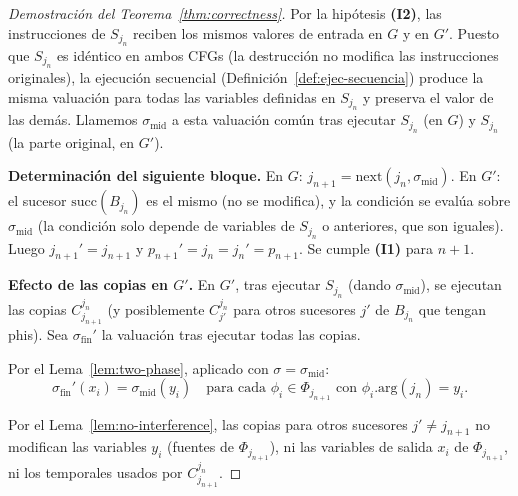 \documentclass[12pt, a4paper]{article}
\begin{document}
\begin{proof}[Demostración del Teorema~\ref{thm:correctness}]
Por la hipótesis \textbf{(I2)}, las instrucciones de $S_{j_n}$ reciben los mismos valores de
entrada en $G$ y en $G'$. Puesto que $S_{j_n}$ es idéntico en ambos CFGs
(la destrucción no modifica las instrucciones originales), la ejecución secuencial
(Definición~\ref{def:ejec-secuencia}) produce la misma valuación para todas las variables
definidas en $S_{j_n}$ y preserva el valor de las demás. Llamemos $\sigma_{\mathrm{mid}}$
a esta valuación común tras ejecutar $S_{j_n}$ (en $G$) y $S_{j_n}$ (la parte original, en $G'$).

\medskip
\textbf{Determinación del siguiente bloque.}
En $G$: $j_{n+1} = \mathrm{next}(j_n, \sigma_{\mathrm{mid}})$.
En $G'$: el sucesor $\mathrm{succ}(B_{j_n})$ es el mismo (no se modifica), y la condición
se evalúa sobre $\sigma_{\mathrm{mid}}$ (la condición solo depende de variables de $S_{j_n}$
o anteriores, que son iguales). Luego $j_{n+1}' = j_{n+1}$ y $p_{n+1}' = j_n = j_n' = p_{n+1}$.
Se cumple \textbf{(I1)} para $n+1$.

\medskip
%
%
\textbf{Efecto de las copias en $G'$.}
En $G'$, tras ejecutar $S_{j_n}$ (dando $\sigma_{\mathrm{mid}}$), se ejecutan las copias
$C_{j_{n+1}}^{j_n}$ (y posiblemente $C_{j'}^{j_n}$ para otros sucesores $j'$ de $B_{j_n}$
que tengan phis). Sea $\sigma_{\mathrm{fin}}'$ la valuación tras ejecutar todas las copias.

Por el Lema~\ref{lem:two-phase}, aplicado con $\sigma = \sigma_{\mathrm{mid}}$:
\[
  \sigma_{\mathrm{fin}}'(x_i) = \sigma_{\mathrm{mid}}(y_i)
  \quad \text{para cada } \phi_i \in \Phi_{j_{n+1}} \text{ con } \phi_i.\mathrm{arg}(j_n) = y_i.
\]

Por el Lema~\ref{lem:no-interference}, las copias para otros sucesores $j' \neq j_{n+1}$
no modifican las variables $y_i$ (fuentes de $\Phi_{j_{n+1}}$), ni las variables de salida
$x_i$ de $\Phi_{j_{n+1}}$, ni los temporales usados por $C_{j_{n+1}}^{j_n}$.


\end{proof}
\end{document}
